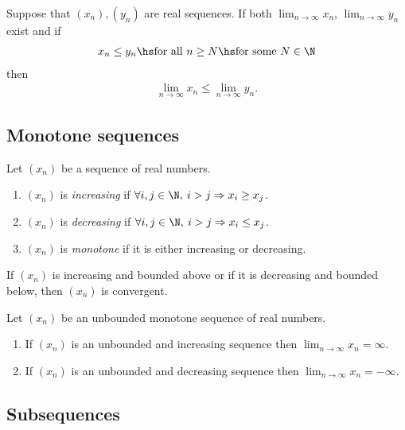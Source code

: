 \documentclass{article}
\begin{document}
\begin{theorem}
    Suppose that $(x_n),(y_n)$ are real sequences. If both $\lim_{n\to\infty}x_n$, $\lim_{n\to\infty}y_n$
    exist and if
    \begin{align*}
        x_n\leq y_n \hs \text{for all } n\geq N \hs \text{for some }N\in\N
    \end{align*} 
    then
    \begin{align*}
        \lim_{n\to\infty}x_n\leq \lim_{n\to\infty}y_n.
    \end{align*}
\end{theorem}

\subsection{Monotone sequences}

\begin{definition}
    Let $(x_n)$ be a sequence of real numbers.
    \begin{enumerate}
        \item $(x_n)$ is \emph{increasing} if $\forall i,j\in\N,\: i>j \Rightarrow x_i \geq x_j$.
        \item $(x_n)$ is \emph{decreasing} if $\forall i,j\in\N,\: i>j \Rightarrow x_i \leq x_j$.
        \item $(x_n)$ is \emph{monotone} if it is either increasing or decreasing.
    \end{enumerate}
\end{definition}

\begin{theorem}
    If $(x_n)$ is increasing and bounded above or if it is decreasing and bounded below, then
    $(x_n)$ is convergent.
\end{theorem}

\setcounter{theorem}{3}
\begin{theorem}
    Let $(x_n)$ be an unbounded monotone sequence of real numbers.
    \begin{enumerate}
        \item If $(x_n)$ is an unbounded and increasing sequence then $\lim_{n\to\infty} x_n = \infty$.
        \item If $(x_n)$ is an unbounded and decreasing sequence then $\lim_{n\to\infty} x_n = -\infty$. 
    \end{enumerate}
\end{theorem}

\subsection{Subsequences}
\end{document}
